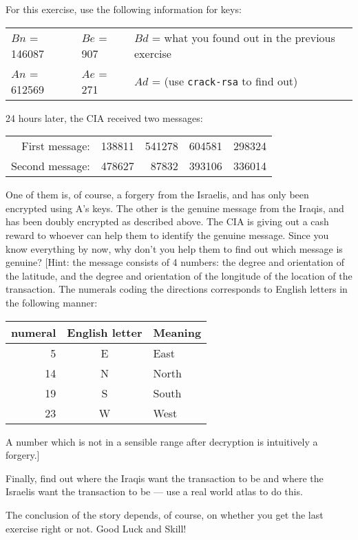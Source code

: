 For this exercise, use the following information for keys:

\begin{center}
\begin{tabular}{lll}
$Bn$ = 146087  &  $Be$ = 907 &   $Bd$ = what you found out in the previous
exercise\\
$An$ = 612569  &  $Ae$ = 271 &   $Ad$ = (use {\tt crack-rsa} to find out)
\end{tabular}
\end{center}

24 hours later, the CIA received two messages:

\begin{center}
\begin{tabular}{rrrrr}
 First message: & 138811 & 541278 & 604581 & 298324 \\	%
Second message: & 478627 &  87832 & 393106 & 336014	%
\end{tabular}
\end{center}

One of them is, of course, a forgery from the Israelis,  and has only
been encrypted using A's keys.  The other is the
genuine message from the Iraqis, and has been doubly encrypted as
described above.   The CIA is giving out a cash reward to
whoever can help them to identify the genuine message.  Since you know
everything by now, why don't you help them to find out which message 
is genuine?  [Hint: the message consists of 4 numbers: the degree and
orientation of the latitude, and the degree and orientation of the longitude
of the location of the transaction.  The numerals coding the directions
corresponds to English letters in the following manner:

\begin{center}
\begin{tabular}{rcl}
       numeral & English letter &  Meaning \\ \hline
         5     &        E       &    East  \\
        14     &        N       &    North \\
        19     &        S       &    South \\
        23     &        W       &    West
\end{tabular}
\end{center}

A number which is not in a sensible range after decryption is intuitively a
forgery.] 

Finally, find out where the Iraqis want the transaction to be and
where the Israelis want the transaction to be --- use a real world atlas
to do this.

The conclusion of the story depends, of course, on whether you get the
last exercise right or not.  Good Luck and Skill!







